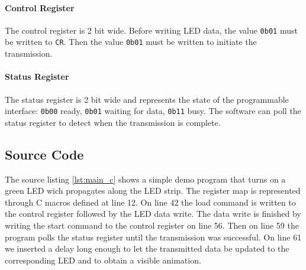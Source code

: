 \documentclass{article}
\begin{document}
\paragraph{Control Register}
The control register is 2 bit wide. Before writing LED data, the value \verb'0b01' must be written to \verb'CR'. Then the value \verb'0b01' must be written to initiate the transmission.

\paragraph{Status Register}
The status register is 2 bit wide and represents the state of the programmable interface:
\verb'0b00' ready, \verb'0b01' waiting for data, \verb'0b11' busy.
The software can poll the status register to detect when the transmission is complete.


\subsection{Source Code}

The source listing \ref{lst:main_c} shows a simple demo program that turns on a green LED wich propagates along the LED strip. The register map is represented through C macros defined at line 12. On line 42 the load command is written to the control register followed by the LED data write. The data write is finished by writing the start command to the control register on line 56. Then on line 59 the program polls the status register until the transmission was successful. On line 61 we inserted a delay long enough to let the transmitted data be updated to the corresponding LED and to obtain a visible animation.
\end{document}
